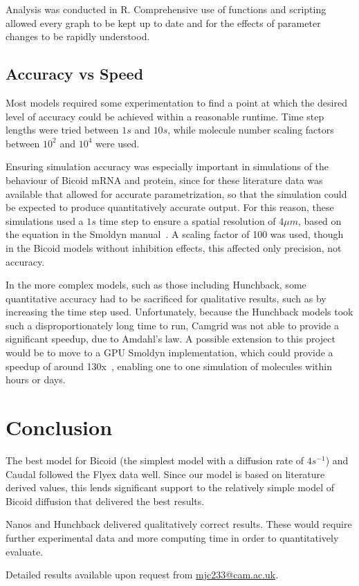 \documentclass[11pt,a4paper,twocolumn]{article}
\begin{document}
Analysis was conducted in R. Comprehensive use of functions and scripting allowed every graph to be kept up to date and for the effects of parameter changes to be rapidly understood.

\subsection{Accuracy vs Speed}
Most models required some experimentation to find a point at which the desired level of accuracy could be achieved within a reasonable runtime. Time step lengths were tried between \(1s\) and \(10s\), while molecule number scaling factors between \(10^2\) and \(10^4\) were used. 

Ensuring simulation accuracy was especially important in simulations of the behaviour of Bicoid mRNA and protein, since for these literature data was available that allowed for accurate parametrization, so that the simulation could be expected to produce quantitatively accurate output. For this reason, these simulations used a \(1s\) time step to ensure a spatial resolution of \(4\mu m\), based on the equation in the Smoldyn manual~\cite{Andrews2011}. A scaling factor of 100 was used, though in the Bicoid models without inhibition effects, this affected only precision, not accuracy.

In the more complex models, such as those including Hunchback, some quantitative accuracy had to be sacrificed for qualitative results, such as by increasing the time step used. Unfortunately, because the Hunchback models took such a disproportionately long time to run, Camgrid was not able to provide a significant speedup, due to Amdahl’s law. A possible extension to this project would be to move to a GPU Smoldyn implementation, which could provide a speedup of around 130x~\cite{Dematte2010}, enabling one to one simulation of molecules within hours or days.


\section{Conclusion}
The best model for Bicoid (the simplest model with a diffusion rate of \(4s^{-1}\)) and Caudal followed the Flyex data well. Since our model is based on literature derived values, this lends significant support to the relatively simple model of Bicoid diffusion that delivered the best results. 

Nanos and Hunchback delivered qualitatively correct results. These would require further experimental data and more computing time in order to quantitatively evaluate.

Detailed results available upon request from \href{mailto:mjc233@cam.ac.uk}{mjc233@cam.ac.uk}.

\nocite{*}
\pagebreak[4]


\end{document}

